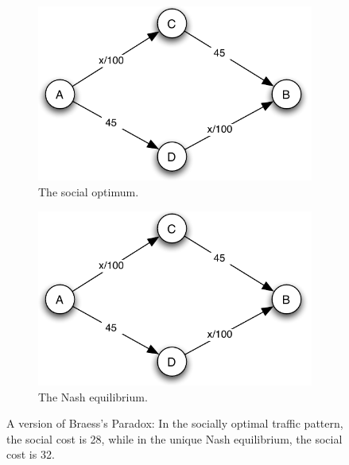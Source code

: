 \documentclass[10pt]{beamer}
\begin{document}
\begin{frame}
  \begin{figure}[h]
    \centering
    \onslide<+->
    \begin{subfigure}{0.45\textwidth}
        \centering
        \includegraphics[width=\textwidth,page=4]{fig/note02/braess.pdf}
        \caption{The social optimum.}
        \label{fig:social_optimum}
    \end{subfigure}
    \hfill %
    \onslide<+->
    \begin{subfigure}{0.45\textwidth}
        \centering
        \includegraphics[width=\textwidth,page=5]{fig/note02/braess.pdf}
        \vspace{1mm}
        \caption{The Nash equilibrium.}
        \label{fig:nash_equilibrium}
    \end{subfigure}
    \onslide<+->
    \caption{A version of Braess's Paradox: In the socially optimal traffic pattern, the social cost is 28, while in the unique Nash equilibrium, the social cost is 32.}
    \label{fig:braess_paradox}
  \end{figure}
\end{frame}
\end{document}
